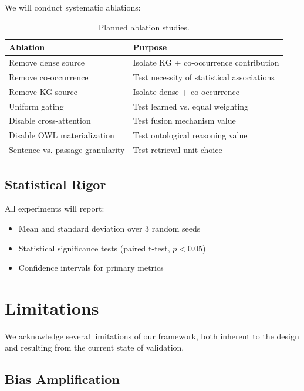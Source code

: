 \documentclass[11pt,a4paper]{article}
\begin{document}
We will conduct systematic ablations:

\begin{table}[h]
\centering
\small
\begin{tabular}{ll}
\toprule
\textbf{Ablation} & \textbf{Purpose} \\
\midrule
Remove dense source & Isolate KG + co-occurrence contribution \\
Remove co-occurrence & Test necessity of statistical associations \\
Remove KG source & Isolate dense + co-occurrence \\
Uniform gating & Test learned vs. equal weighting \\
Disable cross-attention & Test fusion mechanism value \\
Disable OWL materialization & Test ontological reasoning value \\
Sentence vs. passage granularity & Test retrieval unit choice \\
\bottomrule
\end{tabular}
\caption{Planned ablation studies.}
\label{tab:ablations}
\end{table}

\subsection{Statistical Rigor}

All experiments will report:
\begin{itemize}
    \item Mean and standard deviation over 3 random seeds
    \item Statistical significance tests (paired t-test, $p < 0.05$)
    \item Confidence intervals for primary metrics
\end{itemize}

\section{Limitations}
\label{sec:limitations}

We acknowledge several limitations of our framework, both inherent to the design and resulting from the current state of validation.

\subsection{Bias Amplification}
\end{document}
